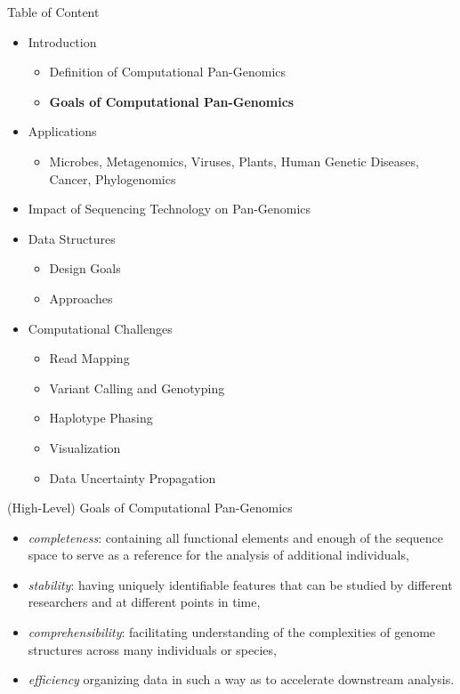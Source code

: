 \documentclass[notes=hide]{beamer}
\newcommand{\0}{\ensuremath{\mathtt{0}}}
\newcommand{\1}{\ensuremath{\mathtt{1}}}
\begin{document}
\begin{frame}{Table of Content}
\begin{itemize}
 \item Introduction
 \begin{itemize}
    \item Definition of Computational Pan-Genomics
    \item {\color{red}\textbf{Goals of Computational Pan-Genomics}}
 \end{itemize}
\item Applications
 \begin{itemize}
    \item Microbes, Metagenomics, Viruses, Plants, Human Genetic Diseases, Cancer, Phylogenomics
 \end{itemize}
\item Impact of Sequencing Technology on Pan-Genomics
\item Data Structures
 \begin{itemize}
    \item Design Goals
    \item Approaches
 \end{itemize}
\item Computational Challenges
 \begin{itemize}
    \item Read Mapping
    \item Variant Calling and Genotyping
    \item Haplotype Phasing
    \item Visualization
    \item Data Uncertainty Propagation
 \end{itemize}
\end{itemize}
\end{frame}

\begin{frame}{(High-Level) Goals of Computational Pan-Genomics}
\begin{itemize}
 \item \emph{completeness}: containing all functional elements and enough of the sequence space to serve as a reference for the analysis of additional individuals,
 \item \emph{stability}: having uniquely identifiable features that can be studied by different researchers and at different points in time,
 \item \emph{comprehensibility}: facilitating understanding of the complexities of genome structures across many individuals or species,
 \item \emph{efficiency} organizing data in such a way as to accelerate downstream analysis.
\end{itemize}
\end{frame}
\end{document}

